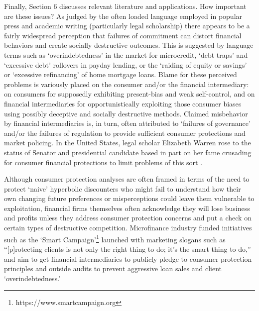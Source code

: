 \documentclass[11pt,english]{article}
\theoremstyle{plain}
\theoremstyle{definition}
\begin{document}
Finally, Section 6 discusses relevant literature and  applications.
How important are these issues? As judged by the often loaded language employed in popular press and academic writing (particularly
legal scholarship) there appears to be a fairly widespread perception that failures of commitment can
distort financial behaviors and create socially destructive outcomes. This is suggested by language terms such as  `overindebtedness' in the market for microcredit,  `debt traps'
and `excessive debt' rollovers in payday lending, or the `raiding of equity or savings' or  `excessive refinancing' of home mortgage
loans. Blame for these perceived problems is variously placed on
the consumer and/or the financial intermediary: on consumers for supposedly
exhibiting present-bias and weak self-control, and on financial intermediaries
for  opportunistically exploiting those consumer biases using possibly deceptive and socially destructive
methods. Claimed  misbehavior by financial intermediaries is, in turn, often attributed to `failures of governance' and/or the failures of regulation
to provide sufficient consumer protections and market policing. In
the United States, legal scholar Elizabeth Warren rose to the status of Senator
and  presidential candidate based in part on her fame crusading for consumer financial protections to limit problems of this sort \citep{sullivan2000}.

Although consumer protection analyses are often framed in terms of the need to protect
`naive' hyperbolic discounters who might fail to understand how their
own changing future preferences or misperceptions could leave them vulnerable to exploitation,
financial firms themselves
often acknowledge they will lose business and profits unless they address consumer protection concerns
and put a check on certain types of destructive competition. Microfinance
industry funded initiatives such as the `Smart Campaign'\footnote{https://www.smartcampaign.org}
launched with marketing slogans such as ``{[}p{]}rotecting
clients is not only the right thing to do; it's the smart thing to
do,'' and aim to get financial intermediaries to publicly pledge to consumer protection principles and outside audits to prevent aggressive loan
sales and client `overindebtedness.'
\end{document}
